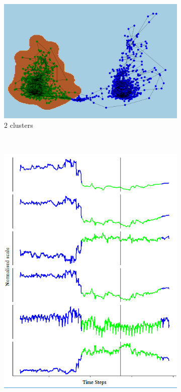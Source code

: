 \documentclass[runningheads]{llncs}
\begin{document}
\begin{figure}[H]
	\centering
	\begin{subfigure}[b]{0.5\textwidth}
		\includegraphics[width=\textwidth]{pca_cluster_2.PNG}
		\caption{\(2\) clusters}
		\label{fig:pca_cluster_2}
	\end{subfigure}
	~
	\begin{subfigure}[b]{0.25\textwidth}
		\includegraphics[width=\textwidth]{context_timeline_2.PNG}
		\label{fig:context_timeline_2}
	\end{subfigure}
	

\end{figure}
\end{document}
